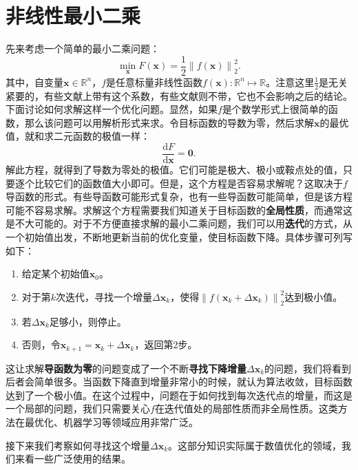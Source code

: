 \section{非线性最小二乘}
先来考虑一个简单的最小二乘问题：
\begin{equation}
\mathop {\min }\limits_{\bm{x}} F(\bm{x}) = \frac{1}{2}{\left\| {f\left( \bm{x} \right)} \right\|^2_2}.
\end{equation}
其中，自变量$\bm{x} \in \mathbb{R}^n$，$f$是任意标量非线性函数$f(\bm{x}): \mathbb{R}^n \mapsto \mathbb{R}$。注意这里$\frac{1}{2}$是无关紧要的，有些文献上带有这个系数，有些文献则不带，它也不会影响之后的结论。下面讨论如何求解这样一个优化问题。显然，如果$f$是个数学形式上很简单的函数，那么该问题可以用解析形式来求。令目标函数的导数为零，然后求解$\bm{x}$的最优值，就和求二元函数的极值一样：
\begin{equation}
\frac{ \mathrm{d} F}{ \mathrm{d} \bm{x} } = \bm{0}.
\end{equation}
解此方程，就得到了导数为零处的极值。它们可能是极大、极小或鞍点处的值，只要逐个比较它们的函数值大小即可。但是，这个方程是否容易求解呢？这取决于$f$导函数的形式。有些导函数可能形式复杂，也有一些导函数可能简单，但是该方程可能不容易求解。求解这个方程需要我们知道关于目标函数的\textbf{全局性质}，而通常这是不大可能的。对于不方便直接求解的最小二乘问题，我们可以用\textbf{迭代}的方式，从一个初始值出发，不断地更新当前的优化变量，使目标函数下降。具体步骤可列写如下：

\begin{mdframed}  
\begin{enumerate}
	\item 给定某个初始值$\bm{x}_0$。
	\item 对于第$k$次迭代，寻找一个增量$\Delta \bm{x}_k$，使得$\left\| {f\left( \bm{x}_k + \Delta \bm{x}_k \right)} \right \|^2_2$达到极小值。
	\item 若$\Delta \bm{x}_k$足够小，则停止。
	\item 否则，令$\bm{x}_{k+1} = \bm{x}_k+\Delta \bm{x}_k$，返回第2步。
\end{enumerate}
\end{mdframed}
这让求解\textbf{导函数为零}的问题变成了一个不断\textbf{寻找下降增量}$\Delta \bm{x}_k$的问题，我们将看到后者会简单很多。当函数下降直到增量非常小的时候，就认为算法收敛，目标函数达到了一个极小值。在这个过程中，问题在于如何找到每次迭代点的增量，而这是一个局部的问题，我们只需要关心$f$在迭代值处的局部性质而非全局性质。这类方法在最优化、机器学习等领域应用非常广泛。

接下来我们考察如何寻找这个增量$\Delta \bm{x}_k$。这部分知识实际属于数值优化的领域，我们来看一些广泛使用的结果。

